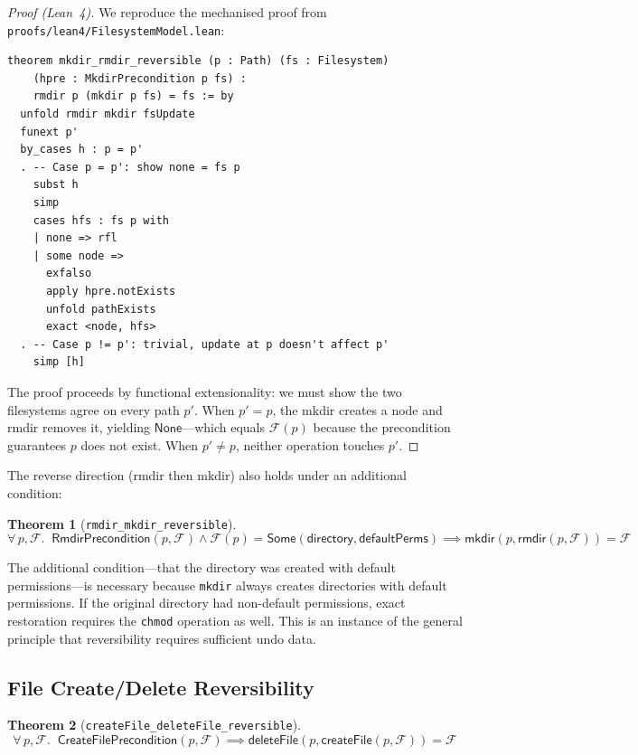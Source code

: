 \documentclass[11pt,a4paper]{article}
\newtheorem{theorem}{Theorem}[section]
\newcommand{\FS}{\mathcal{F}}
\begin{document}
\begin{proof}[Proof (Lean~4)]
We reproduce the mechanised proof from
\texttt{proofs/lean4/FilesystemModel.lean}:

\begin{lstlisting}[style=leanstyle,caption={The mkdir/rmdir reversibility proof in Lean 4.}]
theorem mkdir_rmdir_reversible (p : Path) (fs : Filesystem)
    (hpre : MkdirPrecondition p fs) :
    rmdir p (mkdir p fs) = fs := by
  unfold rmdir mkdir fsUpdate
  funext p'
  by_cases h : p = p'
  . -- Case p = p': show none = fs p
    subst h
    simp
    cases hfs : fs p with
    | none => rfl
    | some node =>
      exfalso
      apply hpre.notExists
      unfold pathExists
      exact <node, hfs>
  . -- Case p != p': trivial, update at p doesn't affect p'
    simp [h]
\end{lstlisting}

The proof proceeds by functional extensionality: we must show the two
filesystems agree on every path $p'$. When $p' = p$, the mkdir creates a node
and rmdir removes it, yielding $\mathsf{None}$---which equals $\FS(p)$ because
the precondition guarantees $p$ does not exist. When $p' \neq p$, neither
operation touches $p'$.
\end{proof}

The reverse direction (rmdir then mkdir) also holds under an additional
condition:

\begin{theorem}[\texttt{rmdir\_mkdir\_reversible}]
\label{thm:rmdir-mkdir}
\[
  \forall\, p, \FS.\;\;
  \mathsf{RmdirPrecondition}(p, \FS) \land
  \FS(p) = \mathsf{Some}(\mathsf{directory}, \mathsf{defaultPerms})
  \implies
  \mathsf{mkdir}(p, \mathsf{rmdir}(p, \FS)) = \FS
\]
\end{theorem}

The additional condition---that the directory was created with default
permissions---is necessary because \texttt{mkdir} always creates directories
with default permissions. If the original directory had non-default
permissions, exact restoration requires the \texttt{chmod} operation as well.
This is an instance of the general principle that reversibility requires
sufficient undo data.

\subsection{File Create/Delete Reversibility}

\begin{theorem}[\texttt{createFile\_deleteFile\_reversible}]
\label{thm:create-delete}
\[
  \forall\, p, \FS.\;\;
  \mathsf{CreateFilePrecondition}(p, \FS) \implies
  \mathsf{deleteFile}(p, \mathsf{createFile}(p, \FS)) = \FS
\]
\end{theorem}
\end{document}
